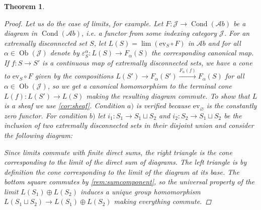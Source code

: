 \documentclass[11pt,A4]{article}
\theoremstyle{plain}
\newtheorem{thm}{Theorem}[section]
\theoremstyle{definition}
\theoremstyle{remark}
\newcommand{\Ab}{\mathscr{A}b}
\DeclareMathOperator{\Cond}{Cond}
\DeclareMathOperator{\Ob}{Ob}
\newcommand{\op}{\oplus}
\newcommand{\ev}{\mathrm{ev}}
\begin{document}
\begin{thm}
\begin{proof}
	Let us do the case of limits, for example.
	Let $F\colon \mathscr{J}\to \Cond(\Ab)$ be a diagram in $\Cond(\Ab)$, i.e. a functor from some indexing category $\mathscr{J}$.
	For an extremally disconnected set $S$, let $L(S)=\lim(\ev_{S}\circ F)$ in $\Ab$ and for all $\alpha \in \Ob(\mathscr{J})$ denote by $\varepsilon^{\alpha}_{S}\colon L(S)\to F_{\alpha}(S)$ the corresponding canonical map.
	If $f\colon S\to S'$ is a continuous map of extremally disconnected sets, we have a cone to $\ev_{S}\circ F$ given by the compositions $L(S')\to F_{\alpha}(S')\xrightarrow{F_{\alpha}(f)} F_{\alpha}(S)$ for all $\alpha\in\Ob(\mathscr{J})$, so we get a canonical homomorphism to the terminal cone $L(f)\colon L(S')\to L(S)$ making the resulting diagram commute.
	To show that $L$ is a sheaf we use \cref{cor:sheaf}.
	Condition $a)$ is verified because $\ev_{\varnothing}$ is the constantly zero functor.
	For condition $b)$ let $i_{1}\colon S_{1}\to S_{1}\sqcup S_{2}$ and $i_{2}\colon S_{2}\to S_{1}\sqcup S_{2}$ be the inclusion of two extremally disconnected sets in their disjoint union and consider the following diagram:
	\begin{center}
	\end{center}
	Since limits commute with finite direct sums, the right triangle is the cone corresponding to the limit of the direct sum of diagrams.
	The left triangle is by definition the cone corresponding to the limit of the diagram at its base.
	The bottom square commutes by \cref{rem:sumcomponent}, so the universal property of the limit $L(S_{1})\op L(S_{2})$ induces a unique group homomorphism $L(S_{1}\sqcup S_{2})\to L(S_{1})\op L(S_{2})$ making everything commute.

\end{proof}
\end{thm}
\end{document}
